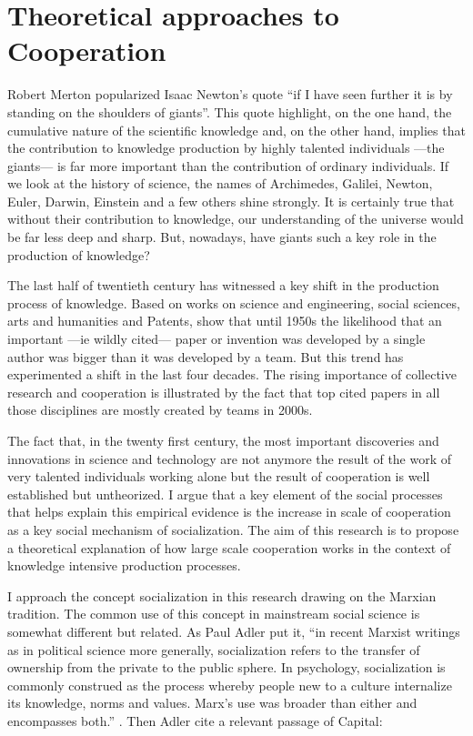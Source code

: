 \chapter{Theoretical approaches to Cooperation}
\label{intro}

Robert Merton popularized Isaac Newton's quote ``if I have seen further it is by standing on the shoulders of giants''. This quote highlight, on the one hand, the cumulative nature of the scientific knowledge and, on the other hand, implies that the contribution to knowledge production by highly talented individuals ---the giants--- is far more important than the contribution of ordinary individuals. If we look at the history of science, the names of Archimedes, Galilei, Newton, Euler, Darwin, Einstein and a few others shine strongly. It is certainly true that without their contribution to knowledge, our understanding of the universe would be far less deep and sharp. But, nowadays, have giants such a key role in the production of knowledge?  

The last half of twentieth century has witnessed a key shift in the production process of knowledge. Based on works on science and engineering, social sciences, arts and humanities and Patents, \citet*{uzzi:2007a} show that until 1950s the likelihood that an important ---ie wildly cited--- paper or invention was developed by a single author was bigger than it was developed by a team. But this trend has experimented a shift in the last four decades. The rising importance of collective research and cooperation is illustrated by the fact that top cited papers in all those disciplines are mostly created by teams in 2000s.

The fact that, in the twenty first century, the most important discoveries and innovations in science and technology are not anymore the result of the work of very talented individuals working alone but the result of cooperation is well established but untheorized. I argue that a key element of the social processes that helps explain this empirical evidence is the increase in scale of cooperation as a key social mechanism of socialization. The aim of this research is to propose a theoretical explanation of how large scale cooperation works in the context of knowledge intensive production processes.

I approach the concept socialization in this research drawing on the Marxian tradition. The common use of this concept in mainstream social science is somewhat different but related. As Paul Adler put it, ``in recent Marxist writings as in political science more generally, socialization refers to the transfer of ownership from the private to the public sphere. In psychology, socialization is commonly construed as the process whereby people new to a culture internalize its knowledge, norms and values. Marx's use was broader than either and encompasses both.'' \citep[1320]{adler:2007}. Then Adler cite a relevant passage of Capital: 

